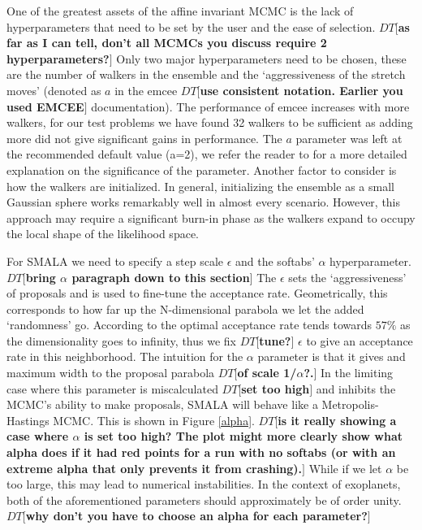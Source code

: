 \documentclass{aa}
\def\memodt#1{\color{green}$DT[${\bf #1}$]$ \color{black}}
\begin{document}
One of the greatest assets of the affine invariant MCMC is the lack of hyperparameters that need to be set by the user and the ease of selection. \memodt{as far as I can tell, don't all MCMCs you discuss require 2 hyperparameters?}
Only two major hyperparameters need to be chosen, these are the number of walkers in the ensemble and the `aggressiveness of the stretch moves' (denoted as $a$ in the emcee \memodt{use consistent notation. Earlier you used EMCEE} documentation). 
The performance of emcee increases with more walkers, for our test problems we have found 32 walkers to be sufficient as adding more did not give significant gains in performance. 
The $a$ parameter was left at the recommended default value (a=2), we refer the reader to \cite{Foreman-Mackey2013} for a more detailed explanation on the significance of the parameter. 
Another factor to consider is how the walkers are initialized. In general, initializing the ensemble as a small Gaussian sphere works remarkably well in almost every scenario. 
However, this approach may require a significant burn-in phase as the walkers expand to occupy the local shape of the likelihood space.
 
For SMALA we need to specify a step scale $\epsilon$ and the softabs' $\alpha$ hyperparameter. \memodt{bring $\alpha$ paragraph down to this section}
The $\epsilon$ sets the `aggressiveness' of proposals and is used to fine-tune the acceptance rate. 
Geometrically, this corresponds to how far up the N-dimensional parabola we let the added `randomness' go. 
According to \cite{robert1998} the optimal acceptance rate tends towards $57\%$ as the dimensionality goes to infinity, thus we fix \memodt{tune?} $\epsilon$ to give an acceptance rate in this neighborhood. 
The intuition for the $\alpha$ parameter is that it gives and maximum width to the proposal parabola \memodt{of scale 1/$\alpha$?.}
In the limiting case where this parameter is miscalculated \memodt{set too high} and inhibits the MCMC's ability to make proposals, SMALA will behave like a Metropolis-Hastings MCMC. 
This is shown in Figure \ref{alpha}. \memodt{is it really showing a case where $\alpha$ is set too high? The plot might more clearly show what alpha does if it had red points for a run with no softabs (or with an extreme alpha that only prevents it from crashing).} 
While if we let $\alpha$ be too large, this may lead to numerical instabilities. 
In the context of exoplanets, both of the aforementioned parameters should approximately be of order unity.
\memodt{why don't you have to choose an alpha for each parameter?}
\end{document}
